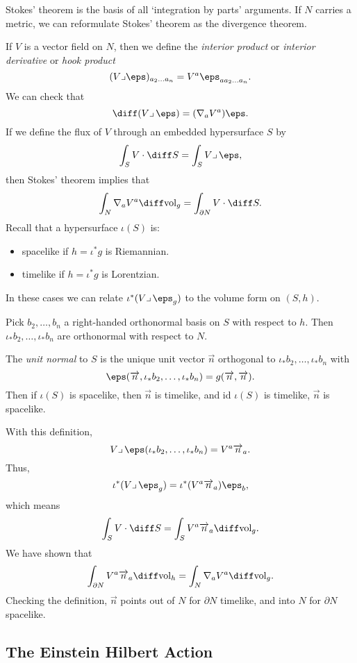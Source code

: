\documentclass[12pt]{article}
\begin{document}
Stokes' theorem is the basis of all `integration by parts' arguments. If $N$ carries a metric, we can reformulate Stokes' theorem as the divergence theorem.

If $V$ is a vector field on $N$, then we define the \emph{interior product} or \emph{interior derivative} or \emph{hook product}
\[
	(V \lrcorner \eps)_{a_2 \ldots a_n} = V^a \eps_{a a_2 \ldots a_n}.
\]
We can check that
\[
\diff (V \lrcorner \,\eps) = (\nabla_a V^a)\eps.
\]
If we define the flux of $V$ through an embedded hypersurface $S$ by
\[
\int_S V \cdot \diff S = \int_S V \lrcorner \, \eps,
\]
then Stokes' theorem implies that
\[
\int_N \nabla_a V^a \diff \mathrm{vol}_g = \int_{\partial N} V \cdot \diff S.
\]
Recall that a hypersurface $\iota(S)$ is:
\begin{itemize}
	\item spacelike if $h = \iota^{\ast} g$ is Riemannian.
	\item timelike if $h = \iota^{\ast} g$ is Lorentzian.
\end{itemize}
In these cases we can relate $\iota^{\ast}(V \lrcorner\, \eps_g)$ to the volume form on $(S, h)$.

Pick $b_2, \ldots, b_n$ a right-handed orthonormal basis on $S$ with respect to $h$. Then $\iota_\ast b_2, \ldots, \iota_\ast b_n$ are orthonormal with respect to $N$.

The \emph{unit normal} to $S$ is the unique unit vector $\overrightarrow n$ orthogonal to $\iota_\ast b_2, \ldots, \iota_\ast b_n$ with
\[
\eps(\overrightarrow n, \iota_\ast b_2, \ldots, \iota_\ast b_n) = g(\overrightarrow n, \overrightarrow n).
\]
Then if $\iota(S)$ is spacelike, then $\overrightarrow n$ is timelike, and id $\iota(S)$ is timelike, $\overrightarrow n$ is spacelike.

With this definition,
\[
V\lrcorner\,\eps(\iota_\ast b_2, \ldots,\iota_\ast b_n)=V^a\overrightarrow n_a.
\]
Thus,
\[
\iota^{\ast}(V\lrcorner\,\eps_g)=\iota^\ast(V^a\overrightarrow n_a)\eps_b,
\]
which means
\[
\int_S V\cdot\diff S=\int_SV^a\overrightarrow n_a\diff\mathrm{vol}_g.
\]
We have shown that
\[
\int_{\partial N}V^a\overrightarrow n_a\diff\mathrm{vol}_h=\int_N\nabla_aV^a\diff\mathrm{vol}_g.
\]
Checking the definition, $\overrightarrow n$ points out of $N$ for $\partial N$ timelike, and into $N$ for $\partial N$ spacelike.

\subsection{The Einstein Hilbert Action}%
\label{sub:eha}
\end{document}
